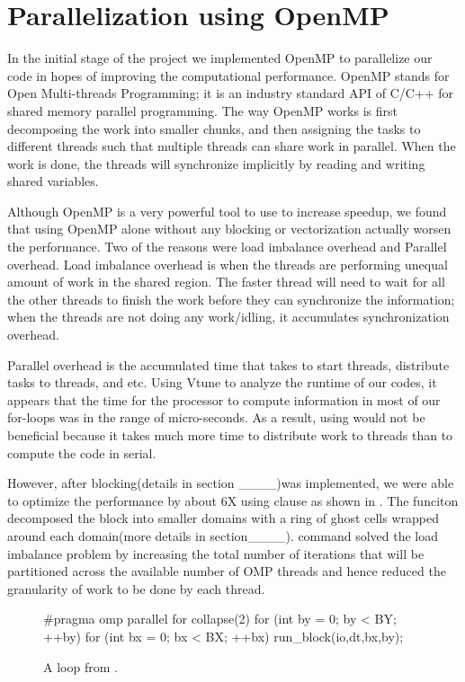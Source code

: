 \section{Parallelization using OpenMP}\label{sec:parallelization}

In the initial stage of the project we implemented OpenMP to parallelize our code in hopes of improving the computational performance. OpenMP stands for Open Multi-threads Programming; it is an industry standard API of C/C++ for shared memory parallel programming.  The way OpenMP works is first decomposing the work into smaller chunks, and then assigning the tasks to different threads such that multiple threads can share work in parallel. When the work is done, the threads will synchronize implicitly by reading and writing shared variables.

Although OpenMP is a very powerful tool to use to increase speedup, we found that using OpenMP alone without any blocking or vectorization actually worsen the performance. Two of the reasons were load imbalance overhead and Parallel overhead. Load imbalance overhead is when the threads are performing unequal amount of work in the shared region. The faster thread will need to wait for all the other threads to finish the work before they can synchronize the information; when the threads are not doing any work/idling, it accumulates synchronization overhead. 

Parallel overhead is the accumulated time that takes to start threads, distribute tasks to threads, and etc. Using Vtune to analyze the runtime of our codes, it appears that the time for the processor to compute information in most of our for-loops was in the range of micro-seconds. As a result, using  would not be beneficial because it takes much more time to distribute work to threads than to compute the code in serial.

However, after blocking(details in section ____)was implemented, we were able to optimize the performance by about 6X using  clause as shown in . The  funciton decomposed the block into smaller domains with a ring of ghost cells wrapped around each domain(more details in section____).  command solved the load imbalance problem by increasing the total number of iterations that will be partitioned across the available number of OMP threads and hence reduced the granularity of work to be done by each thread.

\begin{figure}[h]
\centering
\begin{CPP}[firstnumber=476]
 #pragma omp parallel for collapse(2)
      for (int by = 0; by < BY; ++by) {
         for (int bx = 0; bx < BX; ++bx) {
              run_block(io,dt,bx,by);
                 }
           }
\end{CPP}
\caption{A loop from .}
\label{fig:omp}
\end{figure}
